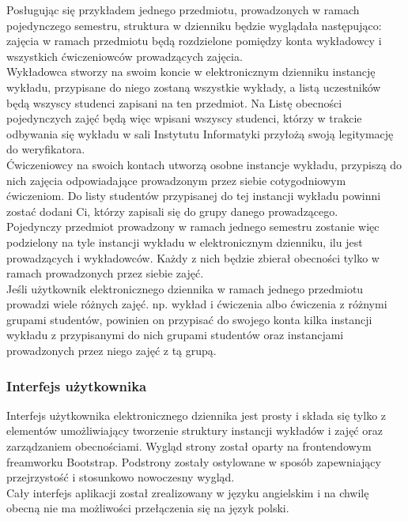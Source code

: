 \documentclass[declaration,shortabstract, mgr]{iithesis}
\begin{document}
\indent Posługując się przykładem jednego przedmiotu, prowadzonych w ramach pojedynczego semestru, struktura w dzienniku będzie wyglądała następująco: zajęcia w ramach przedmiotu będą rozdzielone pomiędzy konta wykładowcy i wszystkich ćwiczeniowców prowadzących zajęcia. \\
\indent Wykładowca stworzy na swoim koncie w elektronicznym dzienniku instancję wykładu, przypisane do niego zostaną wszystkie wykłady, a listą uczestników będą wszyscy studenci zapisani na ten przedmiot. Na Listę obecności pojedynczych zajęć będą więc wpisani wszyscy studenci, którzy w trakcie odbywania się wykładu w sali Instytutu Informatyki przyłożą swoją legitymację do weryfikatora.\\
\indent Ćwiczeniowcy na swoich kontach utworzą osobne instancje wykładu, przypiszą do nich zajęcia odpowiadające prowadzonym przez siebie cotygodniowym ćwiczeniom. Do listy studentów przypisanej do tej instancji wykładu powinni zostać dodani Ci, którzy zapisali się do grupy danego prowadzącego. \\
\indent Pojedynczy przedmiot prowadzony w ramach jednego semestru zostanie więc podzielony na tyle instancji wykładu w elektronicznym dzienniku, ilu jest prowadzących i wykładowców. Każdy z nich będzie zbierał obecności tylko w ramach prowadzonych przez siebie zajęć. \\
\indent Jeśli użytkownik elektronicznego dziennika w ramach jednego przedmiotu prowadzi wiele różnych zajęć. np. wykład i ćwiczenia albo ćwiczenia z różnymi grupami studentów, powinien on przypisać do swojego konta kilka instancji wykładu z przypisanymi do nich grupami studentów oraz instancjami prowadzonych przez niego zajęć z tą grupą.

\subsubsection{Interfejs użytkownika}
\indent Interfejs użytkownika elektronicznego dziennika jest prosty i składa się tylko z elementów umożliwiający tworzenie struktury instancji wykładów i zajęć oraz zarządzaniem obecnościami. Wygląd strony został oparty na frontendowym freamworku Bootstrap\cite{bootstrap}. 
Podstrony zostały ostylowane w sposób zapewniający przejrzystość i stosunkowo nowoczesny wygląd. \\
\indent Cały interfejs aplikacji został zrealizowany w języku angielskim i na chwilę obecną nie ma możliwości przełączenia się na język polski.\\
\end{document}
